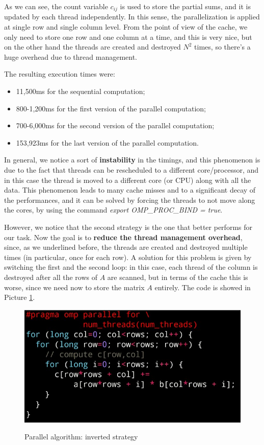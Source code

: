 As we can see, the count variable $c_{ij}$ is used to store the partial sums, and it is updated by each thread independently. In this sense, the parallelization is applied at single row and single column level. From the point of view of the cache, we only need to store one row and one column at a time, and this is very nice, but on the other hand the threads are created and destroyed $N^2$ times, so there's a huge overhead due to thread management.

The resulting execution times were:

\begin{itemize}
    \item 11,500ms for the sequential computation;
    \item 800-1,200ms for the first version of the parallel computation;
    \item 700-6,000ms for the second version of the parallel computation;
    \item 153,923ms for the last version of the parallel computation.
\end{itemize}

In general, we notice a sort of \textbf{instability} in the timings, and this phenomenon is due to the fact that threads can be rescheduled to a different core/processor, and in this case the thread is moved to a different core (or CPU) along with all the data. This phenomenon leads to many cache misses and to a significant decay of the performances, and it can be solved by forcing the threads to not move along the cores, by using the command \textit{export OMP\_PROC\_BIND = true}.

However, we notice that the second strategy is the one that better performs for our task. Now the goal is to \textbf{reduce the thread management overhead}, since, as we underlined before, the threads are created and destroyed multiple times (in particular, once for each row). A solution for this problem is given by switching the first and the second loop: in this case, each thread of the column is destroyed after all the rows of $A$ are scanned, but in terms of the cache this is worse, since we need now to store the matrix $A$ entirely. The code is showed in Picture \ref{par4}.

\begin{figure}[h!]
		\centering
		\includegraphics[scale = 1.6]{img/par4.jpg}
        \label{par4}
        \caption{Parallel algorithm: inverted strategy}
\end{figure}

